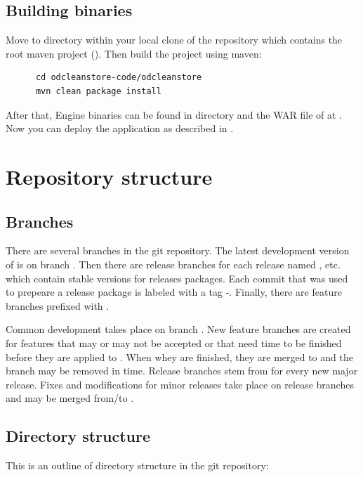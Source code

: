\subsection{Building binaries}
Move to directory  within your local clone of the repository which contains the root maven project (). Then build the project using maven:

\begin{verbatim}
      cd odcleanstore-code/odcleanstore
      mvn clean package install
\end{verbatim}

After that, Engine binaries can be found in directory  and the WAR file of \FE at . Now you can deploy the application as described in . 

\section{Repository structure}
\subsection{Branches}
There are several branches in the git repository. The latest development version of is on branch . Then there are release branches for each release named ,  etc. which contain stable versions for  releases  packages. Each commit that was used to prepeare a release package is labeled with a tag -. Finally, there are feature branches prefixed with .

Common development takes place on branch . New feature branches are created for features that may or may not be accepted or that need time to be finished before they are applied to . When whey are finished, they are merged to  and the branch may be removed in time. Release branches stem from  for every new major release. Fixes and modifications for minor releases take place on release branches and may be merged from/to .

\subsection{Directory structure}
This is an outline of directory structure in the git repository:


